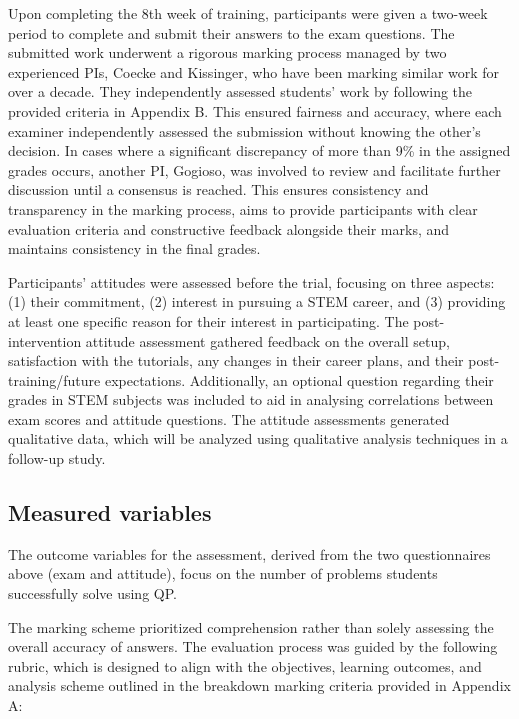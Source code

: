 Upon completing the 8th week of training, participants were given a two-week period to complete and submit their answers to the exam questions.
The submitted work underwent a rigorous marking process managed by two experienced PIs, Coecke and Kissinger, who have been marking similar work for over a decade. They independently assessed students' work by following the provided criteria in Appendix B. This ensured fairness and accuracy, where each examiner independently assessed the submission without knowing the other's decision. In cases where a significant discrepancy of more than 9\% in the assigned grades occurs, another PI, Gogioso, was involved to review and facilitate further discussion until a consensus is reached.
This ensures consistency and transparency in the marking process, aims to provide participants with clear evaluation criteria and constructive feedback alongside their marks, and maintains consistency in the final grades.  

Participants' attitudes were assessed before the trial, focusing on three aspects: (1) their commitment, (2) interest in pursuing a STEM career, and (3) providing at least one specific reason for their interest in participating.
The post-intervention attitude assessment gathered feedback on the overall setup, satisfaction with the tutorials, any changes in their career plans, and their post-training/future expectations. Additionally, an optional question regarding their grades in STEM subjects was included to aid in analysing correlations between exam scores and attitude questions.
The attitude assessments generated qualitative data, which will be analyzed using qualitative analysis techniques in a follow-up study.

\subsection{Measured variables}

The outcome variables for the assessment, derived from the two questionnaires above (exam and attitude), focus on the number of problems students successfully solve using QP. 

The marking scheme prioritized comprehension rather than solely assessing the overall accuracy of answers. The evaluation process was guided by the following rubric, which is designed to align with the objectives, learning outcomes, and analysis scheme outlined in the breakdown marking criteria provided in Appendix A:

